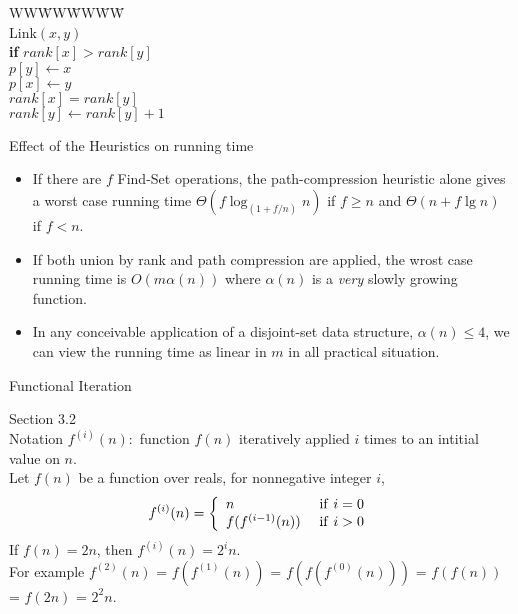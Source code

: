 \documentclass{beamer}
\begin{document}
\begin{frame}{}

\begin{tabbing}
WW\=WW\=WW\=WW\=\kill \\
Link$(x,y)$ \\
{\bf if} $rank[x]>rank[y]$ \\
 $p[y]\leftarrow x$ \\
 $p[x]\leftarrow y$ \\
\> $rank[x]=rank[y]$ \\
\>\> $rank[y]\leftarrow rank[y]+1$\\
\end{tabbing}
\end{frame}

\begin{frame}{}

\centerline{\large Effect of the Heuristics on running time}
\begin{itemize}
\item If there are $f$ {\sc Find-Set} operations, the path-compression
 heuristic alone gives a worst case running time
$\Theta(f\log_{(1+f/n)}n)$ if $f\ge n$ and $\Theta(n+f\lg n)$ if $f<n$.
\item If both union by rank and path compression are applied, the wrost
case running time is $O(m\alpha(n))$ where $\alpha(n)$ is a {\it very}
 slowly growing function.
\item In any conceivable application of a disjoint-set data structure,
 $\alpha(n)\le 4$, we can view the running time as linear in $m$ in all
 practical situation. 
\end{itemize}
\end{frame}

\begin{frame}{}

\centerline{\large Functional Iteration}
{\small Section 3.2} \\
Notation $f^{(i)}(n):$ function $f(n)$ iteratively applied $i$
times to an intitial value on $n$. \\
Let $f(n)$ be a function over reals, for nonnegative integer $i$,
\begin{equation}
f^{(i)}(n) =\left \{
\begin{array}{ll}
n & {\rm \ if\ } i=0 \\
f(f^{(i-1)}(n)) & {\rm \ if\ }i>0
\end{array}
\right.
\end{equation}
If $f(n)=2n$, then $f^{(i)}(n)=2^in$. \\
For example $f^{(2)}(n)$ = $f(f^{(1)}(n))$ = $f(f(f^{(0)}(n)))$ = $f(f(n))$ = $f(2n)$ 
 = $2^2n$. 
\end{frame}
\end{document}
